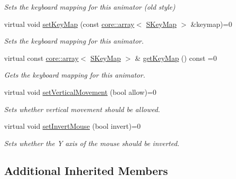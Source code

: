 \begin{DoxyCompactItemize}
\begin{DoxyCompactList}\small\item\em Sets the keyboard mapping for this animator (old style) \end{DoxyCompactList}\item 
virtual void \hyperlink{classirr_1_1scene_1_1ISceneNodeAnimatorCameraFPS_a9a76aeafb9fe79a13b7b128b3eb3b103}{set\+Key\+Map} (const \hyperlink{classirr_1_1core_1_1array}{core\+::array}$<$ \hyperlink{structirr_1_1SKeyMap}{S\+Key\+Map} $>$ \&keymap)=0
\begin{DoxyCompactList}\small\item\em Sets the keyboard mapping for this animator. \end{DoxyCompactList}\item 
\mbox{\label{classirr_1_1scene_1_1ISceneNodeAnimatorCameraFPS_aa3b428a56758529574a14f5d480c2bb7}} 
virtual const \hyperlink{classirr_1_1core_1_1array}{core\+::array}$<$ \hyperlink{structirr_1_1SKeyMap}{S\+Key\+Map} $>$ \& \hyperlink{classirr_1_1scene_1_1ISceneNodeAnimatorCameraFPS_aa3b428a56758529574a14f5d480c2bb7}{get\+Key\+Map} () const =0
\begin{DoxyCompactList}\small\item\em Gets the keyboard mapping for this animator. \end{DoxyCompactList}\item 
virtual void \hyperlink{classirr_1_1scene_1_1ISceneNodeAnimatorCameraFPS_a56cd5340472cc22e08ff17217af8af89}{set\+Vertical\+Movement} (bool allow)=0
\begin{DoxyCompactList}\small\item\em Sets whether vertical movement should be allowed. \end{DoxyCompactList}\item 
virtual void \hyperlink{classirr_1_1scene_1_1ISceneNodeAnimatorCameraFPS_abe634d0c7b03cc6f5adb9df3f04bacd5}{set\+Invert\+Mouse} (bool invert)=0
\begin{DoxyCompactList}\small\item\em Sets whether the Y axis of the mouse should be inverted. \end{DoxyCompactList}\end{DoxyCompactItemize}
\subsection*{Additional Inherited Members}


